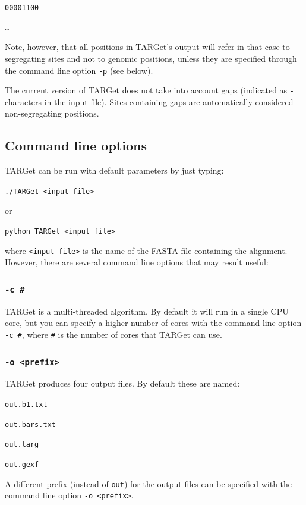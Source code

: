 \documentclass[12pt]{article}
\begin{document}
\texttt{00001100}

\texttt{\ldots}

\noindent Note, however, that all positions in TARGet's output will refer in that case to segregating sites and not to genomic positions, unless they are specified through the command line option \texttt{-p} (see below).

The current version of TARGet does not take into account gaps (indicated as \texttt{-} characters in the input file). Sites containing gaps are automatically considered non-segregating positions.

\subsection*{Command line options}

TARGet can be run with default parameters by just typing:

\texttt{./TARGet <input file>}

\noindent or

\texttt{python TARGet <input file>}

\noindent where \texttt{<input file>} is the name of the FASTA file containing the alignment. However, there are several command line options that may result useful:

\subsubsection*{\texttt{-c \#}}

TARGet is a multi-threaded algorithm. By default it will run in a single CPU core, but you can specify a higher number of cores with the command line option \texttt{-c \#}, where \texttt{\#} is the number of cores that TARGet can use.

\subsubsection*{\texttt{-o <prefix>}}

TARGet produces four output files. By default these are named:

\texttt{out.b1.txt}

\texttt{out.bars.txt} 

\texttt{out.targ}

\texttt{out.gexf}

\noindent A different prefix (instead of \texttt{out}) for the output files can be specified with the command line option \texttt{-o <prefix>}.
\end{document}
